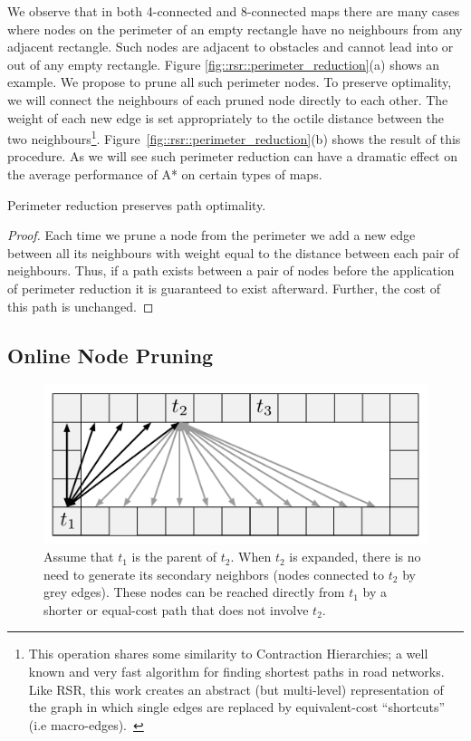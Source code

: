 We observe that in both 4-connected and 8-connected maps there are many cases
where nodes on the perimeter of an empty rectangle have no neighbours from any
adjacent rectangle.  Such nodes are adjacent to obstacles and cannot lead into
or out of any empty rectangle.  Figure \ref{fig::rsr::perimeter_reduction}(a)
shows an example.  We propose to prune all such perimeter nodes. To preserve
optimality, we will connect the neighbours of each pruned node directly to
each other.  The weight of each new edge is set appropriately to the octile
distance between the two neighbours\footnote{This operation shares some similarity
to Contraction Hierarchies; a well known and very fast algorithm for finding
shortest paths in road networks. Like RSR, this work creates an abstract
(but multi-level) representation of the graph in which single edges are replaced 
by equivalent-cost ``shortcuts'' (i.e macro-edges).~\cite{geisberger08}}.
Figure~\ref{fig::rsr::perimeter_reduction}(b) shows the result of this
procedure.  As we will see such perimeter reduction can have a dramatic effect
on the average performance of A* on certain types of maps.
\begin{lemma}
Perimeter reduction preserves path optimality.
\end{lemma}
\begin{proof}
Each time we prune a node from the perimeter we add a new edge between
all its neighbours with weight equal to the distance between each pair
of neighbours.  Thus, if a path exists between a pair of nodes before the
application of perimeter reduction it is guaranteed to exist afterward.
Further, the cost of this path is unchanged.
\end{proof}

\subsection{Online Node Pruning}
\label{cha::rsr::online_pruning}

\begin{figure}[bt]
	\begin{center}
	\includegraphics[width=0.5\columnwidth, trim = 10mm 10mm 10mm 0mm]
	{chapter_rsr/diagrams/online_pruning.pdf}
	\end{center}
	\vspace{-3pt}
	\caption[RSR enhancement: online pruning]
    {\small
	Assume that $t_{1}$ is the parent of $t_2$. When $t_2$
	is expanded, there is no need to generate its secondary neighbors
	(nodes connected to $t_2$ by grey edges). These nodes can be reached directly 
	from $t_1$ by a shorter or equal-cost path that does not involve $t_2$.
}
\label{fig::rsr::online_pruning}
\end{figure}

